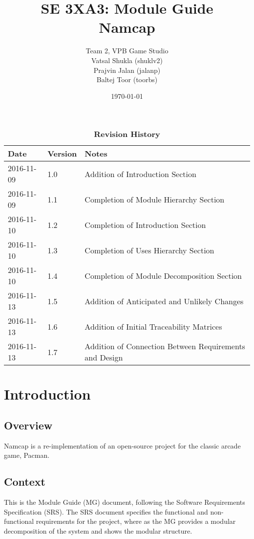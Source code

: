 \documentclass[12pt, titlepage]{article}
\title{SE 3XA3: Module Guide\\Namcap}
\author{Team 2, VPB Game Studio
		\\ Vatsal Shukla (shuklv2)
		\\ Prajvin Jalan (jalanp)
		\\ Baltej Toor (toorbs)
}
\date{\today}
\begin{document}
\maketitle

\tableofcontents
\listoftables
\listoffigures

\begin{table}[h]
\caption{\bf Revision History}
\begin{tabularx}{\textwidth}{p{3cm}p{2cm}X}
\toprule {\bf Date} & {\bf Version} & {\bf Notes}\\
\midrule
2016-11-09 & 1.0 & Addition of Introduction Section\\
2016-11-09 & 1.1 & Completion of Module Hierarchy Section\\
2016-11-10 & 1.2 & Completion of Introduction Section\\
2016-11-10 & 1.3 & Completion of Uses Hierarchy Section\\
2016-11-10 & 1.4 & Completion of Module Decomposition Section\\
2016-11-13 & 1.5 & Addition of Anticipated and Unlikely Changes\\
2016-11-13 & 1.6 & Addition of Initial Traceability Matrices\\
2016-11-13 & 1.7 & Addition of Connection Between Requirements and Design\\
\bottomrule
\end{tabularx}
\end{table}

\newpage


\section{Introduction}

\subsection{Overview}
Namcap is a re-implementation of an open-source project for the classic arcade game, Pacman.

\subsection{Context}
This is the Module Guide (MG) document, following the Software Requirements Specification (SRS). The SRS document specifies the functional and non-functional requirements for the project, where as the MG provides a modular decomposition of the system and shows the modular structure.
\end{document}
